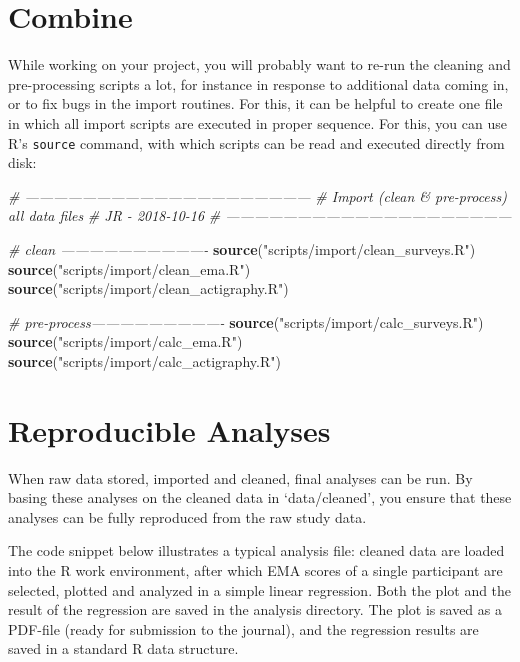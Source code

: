 \documentclass[]{book}
\newenvironment{Shaded}{\begin{snugshade}}{\end{snugshade}}
\newcommand{\KeywordTok}[1]{\textcolor[rgb]{0.13,0.29,0.53}{\textbf{#1}}}
\newcommand{\StringTok}[1]{\textcolor[rgb]{0.31,0.60,0.02}{#1}}
\newcommand{\CommentTok}[1]{\textcolor[rgb]{0.56,0.35,0.01}{\textit{#1}}}
\newcommand{\NormalTok}[1]{#1}
\begin{document}
\section{Combine}\label{combine}

While working on your project, you will probably want to re-run the
cleaning and pre-processing scripts a lot, for instance in response to
additional data coming in, or to fix bugs in the import routines. For
this, it can be helpful to create one file in which all import scripts
are executed in proper sequence. For this, you can use R's
\texttt{source} command, with which scripts can be read and executed
directly from disk:

\begin{Shaded}
\begin{Highlighting}[]
\CommentTok{# ------------------------------------------------------------}
\CommentTok{# Import (clean & pre-process) all data files }
\CommentTok{# JR - 2018-10-16}
\CommentTok{# ------------------------------------------------------------}

\CommentTok{# clean -------------------------------}
\KeywordTok{source}\NormalTok{(}\StringTok{"scripts/import/clean_surveys.R"}\NormalTok{) }
\KeywordTok{source}\NormalTok{(}\StringTok{"scripts/import/clean_ema.R"}\NormalTok{) }
\KeywordTok{source}\NormalTok{(}\StringTok{"scripts/import/clean_actigraphy.R"}\NormalTok{) }

\CommentTok{# pre-process----------------------------}
\KeywordTok{source}\NormalTok{(}\StringTok{"scripts/import/calc_surveys.R"}\NormalTok{) }
\KeywordTok{source}\NormalTok{(}\StringTok{"scripts/import/calc_ema.R"}\NormalTok{)}
\KeywordTok{source}\NormalTok{(}\StringTok{"scripts/import/calc_actigraphy.R"}\NormalTok{) }
\end{Highlighting}
\end{Shaded}

\section{Reproducible Analyses}\label{reproducible-analyses}

When raw data stored, imported and cleaned, final analyses can be run.
By basing these analyses on the cleaned data in `data/cleaned', you
ensure that these analyses can be fully reproduced from the raw study
data.

The code snippet below illustrates a typical analysis file: cleaned data
are loaded into the R work environment, after which EMA scores of a
single participant are selected, plotted and analyzed in a simple linear
regression. Both the plot and the result of the regression are saved in
the analysis directory. The plot is saved as a PDF-file (ready for
submission to the journal), and the regression results are saved in a
standard R data structure.
\end{document}

